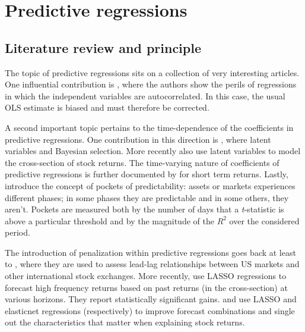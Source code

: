 \documentclass[]{krantz}
\theoremstyle{definition}
\theoremstyle{definition}
\theoremstyle{definition}
\theoremstyle{remark}
\begin{document}
\hypertarget{predictive-regressions}{%
\section{Predictive regressions}\label{predictive-regressions}}

\hypertarget{literature-review-and-principle}{%
\subsection{Literature review and
principle}\label{literature-review-and-principle}}

The topic of predictive regressions sits on a collection of very
interesting articles. One influential contribution is
\citet{stambaugh1999predictive}, where the authors show the perils of
regressions in which the independent variables are autocorrelated. In
this case, the usual OLS estimate is biased and must therefore be
corrected.

A second important topic pertains to the time-dependence of the
coefficients in predictive regressions. One contribution in this
direction is \citet{dangl2012predictive}, where latent variables and
Bayesian selection. More recently \citet{kelly2019characteristics} also
use latent variables to model the cross-section of stock returns. The
time-varying nature of coefficients of predictive regressions is further
documented by \citet{henkel2011time} for short term returns. Lastly,
\citet{farmer2019pockets} introduce the concept of pockets of
predictability: assets or markets experiences different phases; in some
phases they are predictable and in some others, they aren't. Pockets are
measured both by the number of days that a \emph{t}-statistic is above a
particular threshold and by the magnitude of the \(R^2\) over the
considered period.

The introduction of penalization within predictive regressions goes back
at least to \citet{rapach2013international}, where they are used to
assess lead-lag relationships between US markets and other international
stock exchanges. More recently, \citet{chinco2019sparse} use LASSO
regressions to forecast high frequency returns based on past returns (in
the cross-section) at various horizons. They report statistically
significant gains. \citet{han2018firm} and \citet{rapach2019time} use
LASSO and elasticnet regressions (respectively) to improve forecast
combinations and single out the characteristics that matter when
explaining stock returns.
\end{document}
